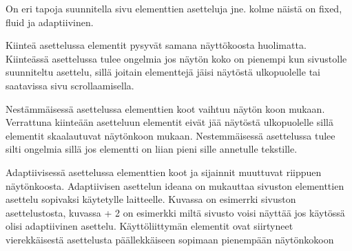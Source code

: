 \documentclass[11pt,a4paper,titlepage,oneside]{article}
\begin{document}
%


%





On eri tapoja suunnitella sivu elementtien asetteluja jne. kolme näistä on fixed, fluid ja adaptiivinen.\citemissing
\medskip



Kiinteä asettelussa elementit pysyvät samana näyttökoosta huolimatta. 
Kiinteässä asettelussa tulee ongelmia jos näytön koko on pienempi kun sivustolle suunniteltu asettelu, 
sillä joitain elementtejä jäisi näytöstä ulkopuolelle tai saatavissa sivu scrollaamisella.\citemissing
\medskip


Nestämmäisessä asettelussa elementtien koot vaihtuu näytön koon mukaan. 
Verrattuna kiinteään asetteluun elementit eivät jää näytöstä ulkopuolelle sillä elementit skaalautuvat näytönkoon mukaan.
Nestemmäisessä asettelussa tulee silti ongelmia sillä jos elementti on liian pieni sille annetulle tekstille.\citemissing
\medskip


Adaptiivisessä asettelussa elementtien koot ja sijainnit muuttuvat riippuen näytönkoosta.\citemissing
Adaptiivisen asettelun ideana on mukauttaa sivuston elementtien asettelu sopivaksi käytetylle laitteelle.
Kuvassa \nextImageCount {} on esimerrki sivuston asettelustosta, kuvassa {\the\numexpr \theimgCounter + 2 } on esimerkki miltä sivusto voisi näyttää jos käytössä olisi adaptiivinen asettelu.
Käyttöliittymän elementit ovat siirtyneet vierekkäisestä asettelusta päällekkäiseen sopimaan pienempään näytönkokoon
\medskip

\bigskip
\end{document}
